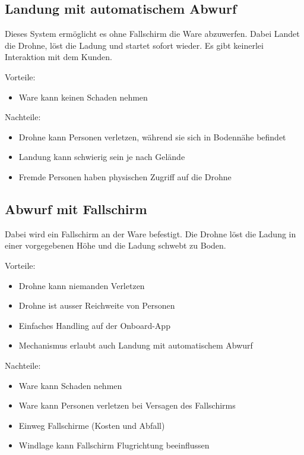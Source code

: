 \subsection{Landung mit automatischem Abwurf}

Dieses System ermöglicht es ohne Fallschirm die Ware abzuwerfen. Dabei Landet die Drohne, löst die Ladung und startet sofort wieder. Es gibt keinerlei Interaktion mit dem Kunden.

Vorteile:
\begin{itemize}
	\item Ware kann keinen Schaden nehmen
\end{itemize}


Nachteile:
\begin{itemize}
	\item Drohne kann Personen verletzen, während sie sich in Bodennähe befindet
	\item Landung kann schwierig sein je nach Gelände
	\item Fremde Personen haben physischen Zugriff auf die Drohne
\end{itemize}


\subsection{Abwurf mit Fallschirm}

Dabei wird ein Fallschirm an der Ware befestigt. Die Drohne löst die Ladung in einer vorgegebenen Höhe und die Ladung schwebt zu Boden.

Vorteile:
\begin{itemize}
	\item Drohne kann niemanden Verletzen 
	\item Drohne ist ausser Reichweite von Personen
	\item Einfaches Handling auf der Onboard-App
	\item Mechanismus erlaubt auch Landung mit automatischem Abwurf
\end{itemize}


Nachteile:
\begin{itemize}
	\item Ware kann Schaden nehmen
	\item Ware kann Personen verletzen bei Versagen des Fallschirms
	\item Einweg Fallschirme (Kosten und Abfall)
	\item Windlage kann Fallschirm Flugrichtung beeinflussen
\end{itemize}


